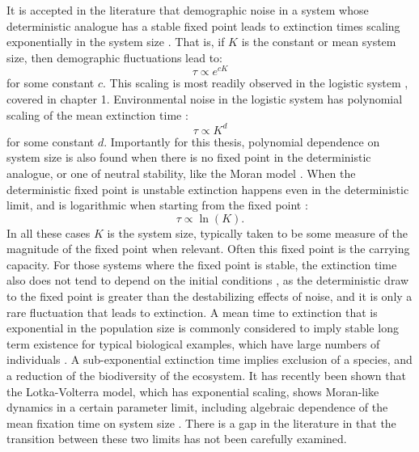 It is accepted in the literature that demographic noise in a system whose deterministic analogue has a stable fixed point leads to extinction times scaling exponentially in the system size \cite{Leigh1981,Lande1993,Kamenev2008,Cremer2009a,Dobrinevski2012,Yu2017}. 
That is, if $K$ is the constant or mean system size, then demographic fluctuations lead to:
\begin{equation}
\tau \propto e^{cK}
\end{equation}
for some constant $c$. 
This scaling is most readily observed in the logistic system \cite{Norden1982,Foley1994,Allen2003a,Doering2005,Assaf2006,Assaf2010,Assaf2016}, covered in chapter 1. %
Environmental noise in the logistic system has polynomial scaling of the mean extinction time \cite{Foley1994,Ovaskainen2010}:
\begin{equation}
\tau \propto K^d
\end{equation}
for some constant $d$. 
Importantly for this thesis, polynomial dependence on system size is also found when there is no fixed point in the deterministic analogue, or one of neutral stability, like the Moran model \cite{Cremer2009,Dobrinevski2012}. 
When the deterministic fixed point is unstable extinction happens even in the deterministic limit, and is logarithmic when starting from the fixed point \cite{Lande1993,Dobrinevski2012,Parsons2018}:
\begin{equation}
\tau \propto \ln(K). 
\end{equation}
In all these cases $K$ is the system size, typically taken to be some measure of the magnitude of the fixed point when relevant. 
Often this fixed point is the carrying capacity. 
For those systems where the fixed point is stable, the extinction time also does not tend to depend on the initial conditions \cite{Chotibut2015}, as the deterministic draw to the fixed point is greater than the destabilizing effects of noise, and it is only a rare fluctuation that leads to extinction. 
A mean time to extinction that is exponential in the population size is commonly considered to imply stable long term existence for typical biological examples, which have large numbers of individuals \cite{Ovaskainen2010,Lin2015}. 
A sub-exponential extinction time implies exclusion of a species, and a reduction of the biodiversity of the ecosystem. 
It has recently been shown that the Lotka-Volterra model, which has exponential scaling, shows Moran-like dynamics in a certain parameter limit, including algebraic dependence of the mean fixation time on system size \cite{Lin2012,Constable2015,Chotibut2015,Young2018}. 
There is a gap in the literature in that the transition between these two limits has not been carefully examined. 

